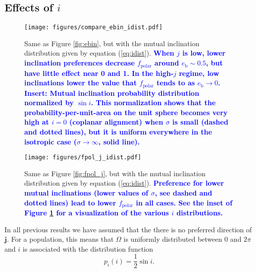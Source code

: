 \documentclass[twocolumn,linenumbers]{aastex631}
\newcommand{\RR}[1]{\textcolor{blue}{\bf#1}} %
\begin{document}
\subsection{Effects of $i$}
\label{subsec:change_i}

\begin{figure*}
    \begin{centering}
        \texttt{[image: figures/compare\_ebin\_idist.pdf]}
        \caption{
            Same as Figure \ref{fig:ebin}, but with the mutual inclination distribution given by equation (\ref{eq:idist}). \RR{When $j$ is low, lower inclination preferences decrease $f_\text{polar}$ around $e_\text{b}\sim0.5$, but have little effect near 0 and 1. In the high-$j$ regime, low inclinations lower the value that $f_\text{polar}$ tends to as $e_\text{b}\rightarrow 0$. {\bf Insert}: Mutual inclination probability distribution normalized by $\sin i$. This normalization shows that the probability-per-unit-area on the unit sphere becomes very high at $i=0$ (coplanar alignment) when $\sigma$ is small (dashed and dotted lines), but it is uniform everywhere in the isotropic case ($\sigma \rightarrow \infty$, solid line).}
        }
        \label{fig:ebin-idist}
    \end{centering}
\end{figure*}

\begin{figure*}
    \begin{centering}
        \texttt{[image: figures/fpol\_j\_idist.pdf]}
        \caption{
            Same as Figure \ref{fig:fpol_j}, but with the mutual inclination distribution given by equation (\ref{eq:idist}). \RR{Preference for lower mutual inclinations (lower values of $\sigma$, see dashed and dotted lines) lead to lower $f_\text{polar}$ in all cases. See the inset of Figure \ref{fig:ebin-idist} for a visualization of the various $i$ distributions.}
        }
        \label{fig:fpol_j-idist}
    \end{centering}
\end{figure*}


In all previous results we have assumed that the there is no preferred direction of $\bm{j}$. For a population, this means that $\Omega$ is uniformly distributed between $0$ and $2\pi$ and $i$ is associated with the distribution function
\begin{equation}
    \label{eq:iso-i}
    p_i(i) = \frac{1}{2}\sin{i} .
\end{equation}
\end{document}
